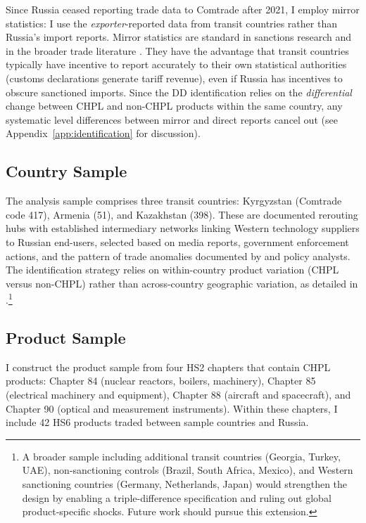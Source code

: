 \documentclass[12pt]{article}
\begin{document}
Since Russia ceased reporting trade data to Comtrade after 2021, I employ mirror statistics: I use the \textit{exporter}-reported data from transit countries rather than Russia's import reports. Mirror statistics are standard in sanctions research \citep{egorov2024sanctions, crozet2020friendly} and in the broader trade literature \citep{head2014gravity}. They have the advantage that transit countries typically have incentive to report accurately to their own statistical authorities (customs declarations generate tariff revenue), even if Russia has incentives to obscure sanctioned imports. Since the DD identification relies on the \textit{differential} change between CHPL and non-CHPL products within the same country, any systematic level differences between mirror and direct reports cancel out (see Appendix~\ref{app:identification} for discussion).

\subsection{Country Sample}

The analysis sample comprises three transit countries: Kyrgyzstan (Comtrade code 417), Armenia (51), and Kazakhstan (398). These are documented rerouting hubs with established intermediary networks linking Western technology suppliers to Russian end-users, selected based on media reports, government enforcement actions, and the pattern of trade anomalies documented by \citet{egorov2024sanctions} and policy analysts. The identification strategy relies on within-country product variation (CHPL versus non-CHPL) rather than across-country geographic variation, as detailed in .\footnote{A broader sample including additional transit countries (Georgia, Turkey, UAE), non-sanctioning controls (Brazil, South Africa, Mexico), and Western sanctioning countries (Germany, Netherlands, Japan) would strengthen the design by enabling a triple-difference specification and ruling out global product-specific shocks. Future work should pursue this extension.}

\subsection{Product Sample}

I construct the product sample from four HS2 chapters that contain CHPL products: Chapter 84 (nuclear reactors, boilers, machinery), Chapter 85 (electrical machinery and equipment), Chapter 88 (aircraft and spacecraft), and Chapter 90 (optical and measurement instruments). Within these chapters, I include 42 HS6 products traded between sample countries and Russia.
\end{document}
